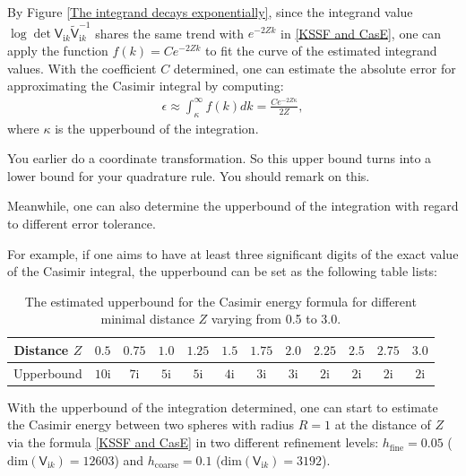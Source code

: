 \begin{remark}\label{remark for upperbound determination}
    By Figure \ref{The integrand decays exponentially}, since the integrand value $\log\det\mathsf{V}_{\mathrm{i}k}\tilde{\mathsf{V}}_{\mathrm{i}k}^{-1}$ 
    shares the same trend with $e^{-2Zk}$ in \eqref{KSSF and CasE}, one can apply the function $f(k) = Ce^{-2Zk}$ to fit the curve of the estimated integrand
    values. With the coefficient $C$ determined, one can estimate the absolute error for approximating the Casimir integral by computing:  
    \begin{align*}
        \epsilon \approx \int_{\kappa}^{\infty}f(k)dk = \frac{Ce^{-2Z\kappa}}{2Z},
    \end{align*}
    where $\kappa$ is the upperbound of the integration. 
    
{\color{red} You earlier do a coordinate transformation. So this upper bound turns into a lower bound for your quadrature rule. You should remark on this}.
    
Meanwhile, one can also determine the upperbound of the integration with regard to different error tolerance. 

For example, if one aims to have at least three significant digits of the exact value of the Casimir integral, the upperbound can be set as the following 
table lists:

\begin{table}[H]
    \centering
    \begin{tabular}{ |c|c|c|c|c|c|c|c|c|c|c|c| }
        \hline
        Distance $Z$ & $ 0.5$ & $ 0.75$  & $ 1.0$ & $1.25$ & $ 1.5$ & $1.75$  & $2.0$ & $2.25$ & $ 2.5$ & $ 2.75$  & $3.0$ \\\hline
        Upperbound & $10\mathrm{i}$ & $7\mathrm{i}$ & $5\mathrm{i}$ & $5\mathrm{i}$ & $4\mathrm{i}$ & $3\mathrm{i}$ & $3\mathrm{i}$ & $2\mathrm{i}$ & $2\mathrm{i}$ & $2\mathrm{i}$ & $2\mathrm{i}$ \\\hline
       \end{tabular}
       \caption{\label{Equal: distance and upperbound error tolerance} The estimated upperbound for the Casimir energy formula for different minimal distance $Z$ varying from 
       0.5 to 3.0.}
\end{table}
\end{remark}

With the upperbound of the integration determined, one can start to estimate the Casimir energy between two spheres with radius $R = 1$ at the 
distance of $Z$ via the formula \eqref{KSSF and CasE} in two different refinement levels: $h_{\text{fine}} = 0.05$ 
($\text{dim}(\mathsf{V}_{\mathrm{i}k}) = 12603$) and $h_{\text{coarse}} = 0.1$ ($\text{dim}(\mathsf{V}_{\mathrm{i}k}) = 3192$).

